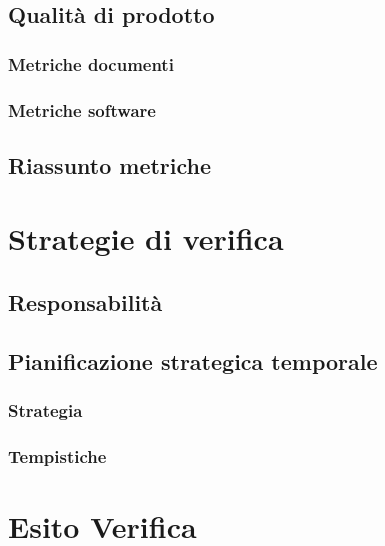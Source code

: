 \documentclass[a4paper, oneside, openany, dvipsnames, table]{article}
\begin{document}
	\subsection{Qualità di prodotto}
	
		\subsubsection{Metriche documenti}
		
		\subsubsection{Metriche software}
		
	\subsection{Riassunto metriche}
	
		
\section{Strategie di verifica}
	
	\subsection{Responsabilità}
		
	\subsection{Pianificazione strategica temporale}
		\subsubsection{Strategia}
			
		\subsubsection{Tempistiche}
			


\appendix
{}

\newpage
\section{Esito Verifica}

\end{document}
